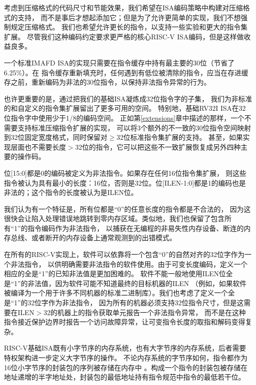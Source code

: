 \begin{commentary}

  考虑到压缩格式的代码尺寸和节能效果，我们希望在ISA编码策略中构建对压缩格式的支持，
  而不是事后才想起添加它；但是为了允许更简单的实现，我们不想强制规定压缩格式。
  我们也希望允许更长的指令，以支持一些实验和更大的指令集扩展。
  尽管我们这种编码约定要求更严格的核心RISC-V ISA编码，但是这样做收益良多。

  一个标准IMAFD ISA的实现只需要在指令缓存中持有最主要的30位（节省了6.25\%）。在
  指令缓存重新填充时，任何遇到有低位被清除的指令，应当在存进缓存之前，重新编码为非法的30位指令，以保持非法指令异常的行为。

  也许更重要的是，通过把我们的基础ISA凝炼成32位指令字的子集，
  我们为非标准的和自定义的指令集扩展留出了更多可用的空间。
  特别地，基础RV32I ISA在32位指令字中使用少于1/8的编码空间。
  正如第\ref{extensions}章中描述的那样，一个不需要支持标准压缩指令扩展的实现，
  可以将3个额外的不一致的30位指令空间映射到32位固定宽度格式，同时保留对$\geq$32位标准指令集扩展的支持。
  甚至，如果实现层面也不需要长度$>$32位的指令，它可以把这些不一致扩展恢复成另外四种主要的操作码。
\end{commentary}

位[15:0]都是0的编码被定义为非法指令。如果存在任何16位指令集扩展，
则这些指令被认为具有最小的长度：16位，否则是32位。位[ILEN-1:0]都是1的编码也是非法的；这个指令的长度被认为是ILEN位。

\begin{commentary}

我们认为有一个特征是，所有位都是“0”的任意长度的指令都是不合法的，
因为这很快会让陷入处理错误地跳转到零内存区域。类似地，我们也保留了包含所有“1”的指令编码作为非法指令，
以捕获在无编程的非易失性内存设备、断连的内存总线、或者断开的内存设备上通常观测到的出错模式。

在所有的RISC-V实现上，软件可以依靠将一个包含“0”的自然对齐的32位字作为一个非法指令，
以供明确需要非法指令的软件使用。由于可变长度编码，定义一个相应的全是“1”的已知非法值是更加困难的。
软件不能一般地使用ILEN位全是“1”的非法值，因为软件可能不知道最终的目标机器的ILEN
（例如，如果软件被编译为一个用于许多不同机器的标准二进制库）。我们也考虑了定义一个全是“1”的32位字作为非法指令，
因为所有的机器必须支持32位指令尺寸，但是这需要在ILEN$>$32的机器上的指令获取单元报告一个非法指令异常，
而不是在这种指令接近保护边界时报告一个访问故障异常，让可变指令长度的取指和解码变得复杂。

\end{commentary}

RISC-V基础ISA既有小字节序的内存系统，也有大字节序的内存系统，后者需要特权架构进一步定义大字节序的操作。
不论内存系统的字节序如何，指令都作为16位小字节序的封装包的序列被存储在内存中
。构成一个指令的封装包被存储在地址递增的半字地址处，封装包的最低地址持有指令规范中指令的最低若干位。

